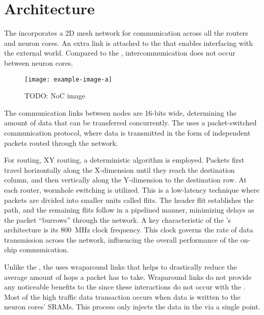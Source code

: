 \section{Architecture}
The \confignoc{} incorporates a 2D mesh network for communication across all the routers and neuron cores.
An extra link is attached to the \confignoc{} that enables interfacing with the external world.
Compared to the \eventnoc{}, intercommunication does not occur between neuron cores.

\begin{figure}[hbtp]
\centering    
\texttt{[image: example-image-a]}
\caption{TODO: NoC image}
\end{figure}

The communication links between nodes are 16-bits wide, determining the amount of data that can be transferred concurrently.
The \confignoc{} uses a packet-switched communication protocol, where data is transmitted in the form of independent packets routed through the network.

For routing, XY routing, a deterministic algorithm is employed.
Packets first travel horizontally along the X-dimension until they reach the destination column, and then vertically along the Y-dimension to the destination row.
At each router, wormhole switching is utilized.
This is a low-latency technique where packets are divided into smaller units called flits.
The header flit establishes the path, and the remaining flits follow in a pipelined manner, minimizing delays as the packet ``burrows'' through the network.
A key characteristic of the \confignoc{}'s architecture is its \SI{800}{MHz} clock frequency.
This clock governs the rate of data transmission across the network, influencing the overall performance of the on-chip communication.

Unlike the \confignoc{}, the \eventnoc{} uses wraparound links that helps to drastically reduce the average amount of hops a packet has to take.
Wraparound links do not provide any noticeable benefits to the \confignoc{} since these interactions do not occur with the \confignoc{}.
Most of the high traffic data transaction occurs when data is written to the neuron cores' SRAMs.
This process only injects the data in the \confignoc{} via a single point.
